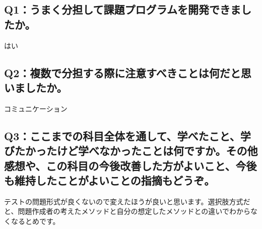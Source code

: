 \documentclass[12pt,a4j]{jarticle}
\begin{document}
\subsection{Q1：うまく分担して課題プログラムを開発できましたか。}
はい

\subsection{Q2：複数で分担する際に注意すべきことは何だと思いましたか。}
コミュニケーション

\subsection{Q3：ここまでの科目全体を通して、学べたこと、学びたかったけど学べなかったことは何ですか。その他感想や、この科目の今後改善した方がよいこと、今後も維持したことがよいことの指摘もどうぞ。}
テストの問題形式が良くないので変えたほうが良いと思います。選択肢方式だと、問題作成者の考えたメソッドと自分の想定したメソッドとの違いでわからなくなるとめです。
\end{document}
